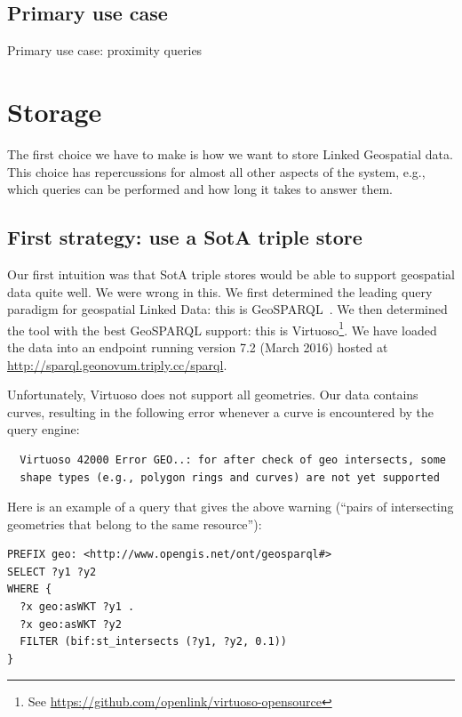 \documentclass[a4paper]{scrartcl}
\newcommand{\seeUrl}[1]{\footnote{See \mbox{\url{#1}}}}
\begin{document}

\subsection{Primary use case}
\label{sec:use_case}

Primary use case: proximity queries


\section{Storage}
\label{sec:storage}

The first choice we have to make is how we want to store Linked
Geospatial data.  This choice has repercussions for almost all other
aspects of the system, e.g., which queries can be performed and how
long it takes to answer them.


\subsection{First strategy: use a SotA triple store}

Our first intuition was that SotA triple stores would be able to
support geospatial data quite well.  We were wrong in this.  We first
determined the leading query paradigm for geospatial Linked Data: this
is GeoSPARQL~\cite{Battle2011}.  We then determined the tool with the
best GeoSPARQL support: this is
Virtuoso\seeUrl{https://github.com/openlink/virtuoso-opensource}.  We
  have loaded the data into an endpoint running version 7.2 (March
  2016) hosted at \url{http://sparql.geonovum.triply.cc/sparql}.

Unfortunately, Virtuoso does not support all geometries.  Our data
contains curves, resulting in the following error whenever a curve is
encountered by the query engine:

\begin{verbatim}
  Virtuoso 42000 Error GEO..: for after check of geo intersects, some
  shape types (e.g., polygon rings and curves) are not yet supported
\end{verbatim}

Here is an example of a query that gives the above warning (``pairs of
intersecting geometries that belong to the same resource''):

\begin{verbatim}
PREFIX geo: <http://www.opengis.net/ont/geosparql#>
SELECT ?y1 ?y2
WHERE {
  ?x geo:asWKT ?y1 .
  ?x geo:asWKT ?y2
  FILTER (bif:st_intersects (?y1, ?y2, 0.1))
}
\end{verbatim}
\end{document}
